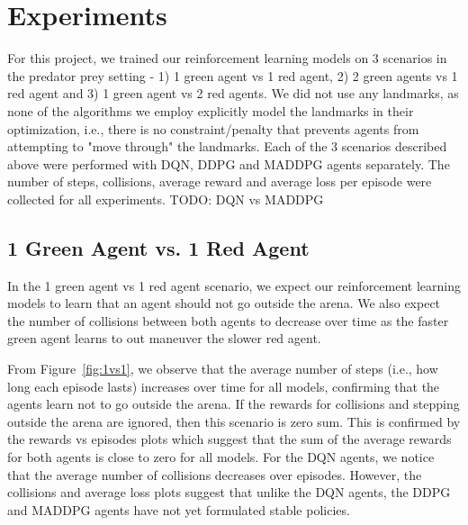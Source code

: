 
\section{Experiments}
\label{sec:experiment}

For this project, we trained our reinforcement learning models on 3 scenarios in the predator prey setting - 1) 1 green agent vs 1 red agent, 2) 2 green agents vs 1 red agent and 3) 1 green agent vs 2 red agents. We did not use any landmarks, as none of the algorithms we employ explicitly model the landmarks in their optimization, i.e., there is no constraint/penalty that prevents agents from attempting to "move through" the landmarks. Each of the 3 scenarios described above were performed with DQN, DDPG and MADDPG agents separately. The number of steps, collisions, average reward and average loss per episode were collected for all experiments. TODO: DQN vs MADDPG  

\subsection{1 Green Agent vs. 1 Red Agent}
\label{sec:experiment:1vs1}

In the 1 green agent vs 1 red agent scenario, we expect our reinforcement learning models to learn that an agent should not go outside the arena. We also expect the number of collisions between both agents to decrease over time as the faster green agent learns to out maneuver the slower red agent.

From Figure~\ref{fig:1vs1}, we observe that the average number of steps (i.e., how long each episode lasts) increases over time for all models, confirming that the agents learn not to go outside the arena. If the rewards for collisions and stepping outside the arena are ignored, then this scenario is zero sum. This is confirmed by the rewards vs episodes plots which suggest that the sum of the average rewards for both agents is close to zero for all models. For the DQN agents, we notice that the average number of collisions decreases over episodes. However, the collisions and average loss plots suggest that unlike the DQN agents, the DDPG and MADDPG agents have not yet formulated stable policies.

